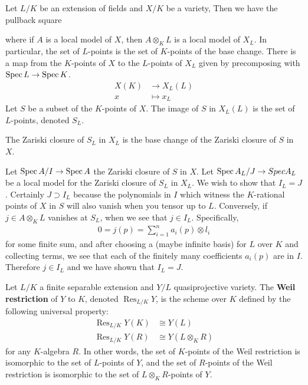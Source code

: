 \documentclass[12pt]{article}
\begin{document}
\begin{example}
    Let $L/K$ be an extension of fields and $X/K$ be a variety, Then we have the pullback square
    \begin{center}
    \end{center}
    where if $A$ is a local model of $X$, then $A \otimes_K L$ is a local model of $X_L$. In particular, the set of $L$-points is the set of $K$-points of the base change. There is a map from the $K$-points of $X$ to the $L$-points of $X_L$ given by precomposing with $\operatorname{Spec} L \to \operatorname{Spec} K$.
    \begin{align*}
        X(K) &\to X_L(L) \\
        x &\mapsto x_L
    \end{align*} Let $S$ be a subset of the $K$-points of $X$. The image of $S$ in $X_L(L)$ is the set of $L$-points, denoted $S_L$.
    \begin{proposition}
        The Zariski closure of $S_L$ in $X_L$ is the base change of the Zariski closure of $S$ in $X$. 
    \end{proposition}
    Let $\operatorname{Spec} A/I \to \operatorname{Spec} A$ the Zariski closure of $S$ in $X$. Let $\operatorname{Spec} A_L/J \to Spec A_L$ be a local model for the Zariski closure of $S_L$ in $X_L$. We wish to show that $I_L = J$. Certainly $J \supset I_L$ because the polynomials in $I$ which witness the $K$-rational points of $X$ in $S$ will also vanish when you tensor up to $L$. Conversely, if $j\in A \otimes_K L$ vanishes at $S_L$, when we see that $j\in I_L$. Specifically, \begin{align*}
        0 = j(p) = \sum_{i=1}^n a_i(p) \otimes l_i
    \end{align*} for some finite sum, and after choosing a (maybe infinite basis) for $L$ over $K$ and collecting terms, we see that each of the finitely many coefficients $a_i(p)$ are in $I$. Therefore $j \in I_L$ and we have shown that $I_L = J$.
\end{example}

\begin{definition}
    Let $L/K$ a finite separable extension and $Y/L$ quasiprojective variety. The \textbf{Weil restriction} of $Y$ to $K$, denoted $\operatorname{Res}_{L/K} Y$, is the scheme over $K$ defined by the following universal property:
    \begin{align*}
        \operatorname{Res}_{L/K} Y(K) &\cong Y(L) \\
        \operatorname{Res}_{L/K} Y(R) &\cong Y(L \otimes_K R)
    \end{align*}
    for any $K$-algebra $R$. In other words, the set of $K$-points of the Weil restriction is isomorphic to the set of $L$-points of $Y$, and the set of $R$-points of the Weil restriction is isomorphic to the set of $L \otimes_K R$-points of $Y$.
\end{definition}
\end{document}
